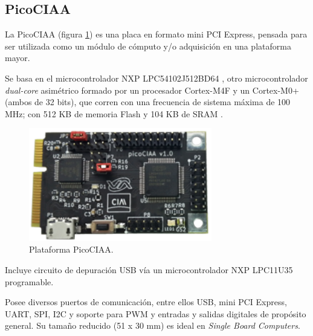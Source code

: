 

\subsection{PicoCIAA}

La PicoCIAA \citep{PicoCIAA} (figura \ref{fig:picoCiaa}) es una placa en formato mini PCI Express, pensada para ser utilizada como un módulo de cómputo y/o adquisición en una plataforma mayor.

Se basa en el microcontrolador NXP LPC54102J512BD64 \citep{LPC54102J512BD64}, otro microcontrolador \emph{dual-core} asimétrico formado por un procesador Cortex-M4F y un Cortex-M0+ (ambos de 32 bits), que corren con una frecuencia de sistema máxima de 100 MHz; con 512 KB de memoria Flash y 104 KB de SRAM .

\begin{figure}[!htbp]
\begin{center}  %
\includegraphics*[width=8cm]{Figures/PicoCIAA_Foto.png}
\par\caption{Plataforma PicoCIAA.}\label{fig:picoCiaa}
\end{center}
\end{figure}

Incluye circuito de depuración USB vía un microcontrolador NXP LPC11U35 \citep{LPC11U35} programable.

Posee diversos puertos de comunicación, entre ellos USB, mini PCI Express, UART, SPI, I2C y soporte para PWM y entradas y salidas digitales de propósito general. Su tamaño reducido (51 x 30 mm) es ideal en \emph{Single Board Computers}.

